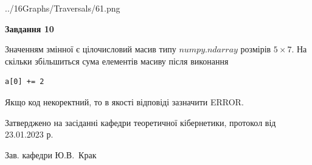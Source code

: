 \documentclass[12pt, ukrainian]{article}
\begin{document}
{\begin {large}
\begin{center}
	{../16Graphs/Traversals/61.png}
\end{center}\par
\newpage

{\begin {center}\textbf{Завдання 10}\end {center}}\par
Значенням змінної  є цілочисловий масив типу $numpy.ndarray$ розмірів $5{\times}7$. На скільки збільшиться сума елементів масиву  після виконання
\begin{verbatim}
a[0] += 2
\end{verbatim}


Якщо код некоректний, то в якості відповіді зазначити ERROR.\par
\newpage


\end {large}
}
{\smallskip \begin {small} Затверджено на засіданні кафедри теоретичної кібернетики, протокол  від   23.01.2023 р.\par\smallskip\smallskip
{\parbox {6.5 cm}{Зав. кафедри \dotfill Ю.В.~Крак}} \end{small}}
\end{document}
